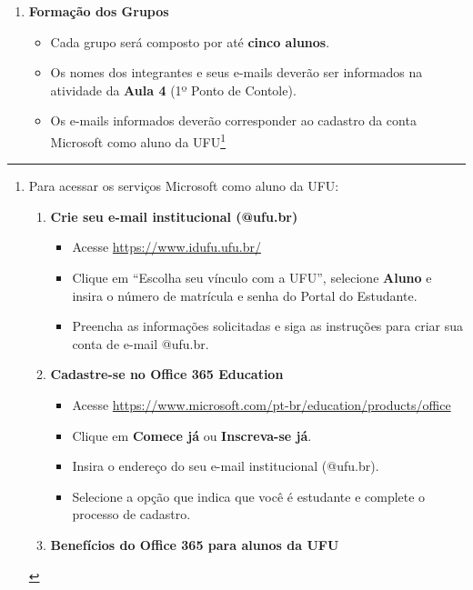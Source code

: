 \documentclass[
  a4paper,
]{book}
\providecommand{\tightlist}{%
  \setlength{\itemsep}{0pt}\setlength{\parskip}{0pt}}\usepackage{longtable,booktabs,array}
\begin{document}
\begin{enumerate}
\def\labelenumi{\arabic{enumi}.}
\item
  \textbf{Formação dos Grupos} 👥

  \begin{itemize}
  \item
    Cada grupo será composto por até \textbf{cinco alunos}.\\
  \item
    Os nomes dos integrantes e seus e-mails deverão ser informados na
    atividade da \textbf{Aula 4} (1º Ponto de Contole).\\
  \item
    Os e-mails informados deverão corresponder ao cadastro da conta
    Microsoft como aluno da UFU\footnote{Para acessar os serviços
      Microsoft como aluno da UFU:

      \begin{enumerate}
      \def\labelenumii{\arabic{enumii}.}
      \tightlist
      \item
        \textbf{Crie seu e-mail institucional (@ufu.br)}

        \begin{itemize}
        \tightlist
        \item
          Acesse \url{https://www.idufu.ufu.br/}
        \item
          Clique em ``Escolha seu vínculo com a UFU'', selecione
          \textbf{Aluno} e insira o número de matrícula e senha do
          Portal do Estudante.
        \item
          Preencha as informações solicitadas e siga as instruções para
          criar sua conta de e-mail @ufu.br.
        \end{itemize}
      \item
        \textbf{Cadastre-se no Office 365 Education}

        \begin{itemize}
        \tightlist
        \item
          Acesse
          \url{https://www.microsoft.com/pt-br/education/products/office}
        \item
          Clique em \textbf{Comece já} ou \textbf{Inscreva-se já}.
        \item
          Insira o endereço do seu e-mail institucional (@ufu.br).
        \item
          Selecione a opção que indica que você é estudante e complete o
          processo de cadastro.
        \end{itemize}
      \item
        \textbf{Benefícios do Office 365 para alunos da UFU}


\end{enumerate}}
\end{itemize}
\end{enumerate}
\end{document}
